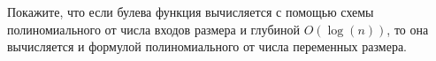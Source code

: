 Покажите, что если булева функция вычисляется с помощью схемы полиномиального от числа входов размера и глубиной $O(\log(n))$,
то она вычисляется и формулой полиномиального от числа переменных размера. 

